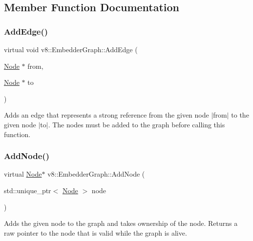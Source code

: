 \subsection{Member Function Documentation}
\mbox{\label{classv8_1_1EmbedderGraph_a1625dcd91021c6de5f039952c9d220d6}} 
\subsubsection{\texorpdfstring{Add\+Edge()}{AddEdge()}}
{\footnotesize\ttfamily virtual void v8\+::\+Embedder\+Graph\+::\+Add\+Edge (\begin{DoxyParamCaption}\item[{\mbox{\hyperlink{classv8_1_1EmbedderGraph_1_1Node}{Node}} $\ast$}]{from,  }\item[{\mbox{\hyperlink{classv8_1_1EmbedderGraph_1_1Node}{Node}} $\ast$}]{to }\end{DoxyParamCaption})\hspace{0.3cm}{\ttfamily [pure virtual]}}

Adds an edge that represents a strong reference from the given node $\vert$from$\vert$ to the given node $\vert$to$\vert$. The nodes must be added to the graph before calling this function. \mbox{\label{classv8_1_1EmbedderGraph_a57afbce6126e5cd82b66f66b018a18e2}} 
\subsubsection{\texorpdfstring{Add\+Node()}{AddNode()}}
{\footnotesize\ttfamily virtual \mbox{\hyperlink{classv8_1_1EmbedderGraph_1_1Node}{Node}}$\ast$ v8\+::\+Embedder\+Graph\+::\+Add\+Node (\begin{DoxyParamCaption}\item[{std\+::unique\+\_\+ptr$<$ \mbox{\hyperlink{classv8_1_1EmbedderGraph_1_1Node}{Node}} $>$}]{node }\end{DoxyParamCaption})\hspace{0.3cm}{\ttfamily [pure virtual]}}

Adds the given node to the graph and takes ownership of the node. Returns a raw pointer to the node that is valid while the graph is alive. \mbox{\label{classv8_1_1EmbedderGraph_a6fdb5451611738dd44c70d195445d0ff}} 
